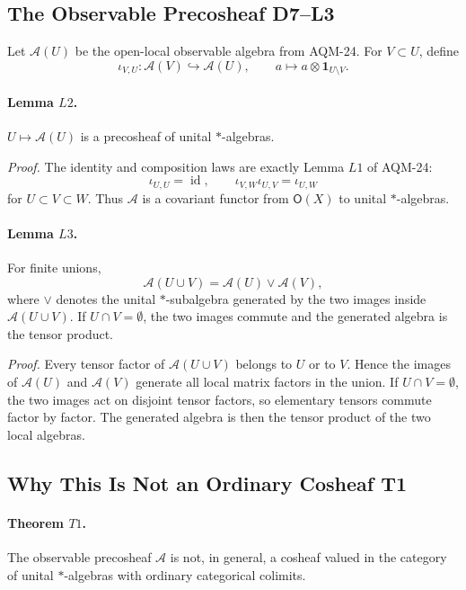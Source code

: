 \subsection{The Observable Precosheaf D7--L3}

Let \(\mathcal A(U)\) be the open-local observable algebra from AQM-24.  For
\(V\subset U\), define
\[
  \iota_{V,U}:\mathcal A(V)\hookrightarrow\mathcal A(U),
  \qquad a\mapsto a\otimes\mathbf 1_{U\setminus V}.
\]

\paragraph{Lemma \(L2\).}
\(U\mapsto\mathcal A(U)\) is a precosheaf of unital \(*\)-algebras.

\emph{Proof.}
The identity and composition laws are exactly Lemma \(L1\) of AQM-24:
\[
  \iota_{U,U}=\operatorname{id},\qquad
  \iota_{V,W}\iota_{U,V}=\iota_{U,W}
\]
for \(U\subset V\subset W\).  Thus \(\mathcal A\) is a covariant functor from
\(\mathsf O(X)\) to unital \(*\)-algebras.

\paragraph{Lemma \(L3\).}
For finite unions,
\[
  \mathcal A(U\cup V)
  =
  \mathcal A(U)\vee\mathcal A(V),
\]
where \(\vee\) denotes the unital \(*\)-subalgebra generated by the two images
inside \(\mathcal A(U\cup V)\).  If \(U\cap V=\emptyset\), the two images
commute and the generated algebra is the tensor product.

\emph{Proof.}
Every tensor factor of \(\mathcal A(U\cup V)\) belongs to \(U\) or to \(V\).
Hence the images of \(\mathcal A(U)\) and \(\mathcal A(V)\) generate all local
matrix factors in the union.  If \(U\cap V=\emptyset\), the two images act on
disjoint tensor factors, so elementary tensors commute factor by factor.  The
generated algebra is then the tensor product of the two local algebras.

\subsection{Why This Is Not an Ordinary Cosheaf T1}

\paragraph{Theorem \(T1\).}
The observable precosheaf \(\mathcal A\) is not, in general, a cosheaf valued
in the category of unital \(*\)-algebras with ordinary categorical colimits.

